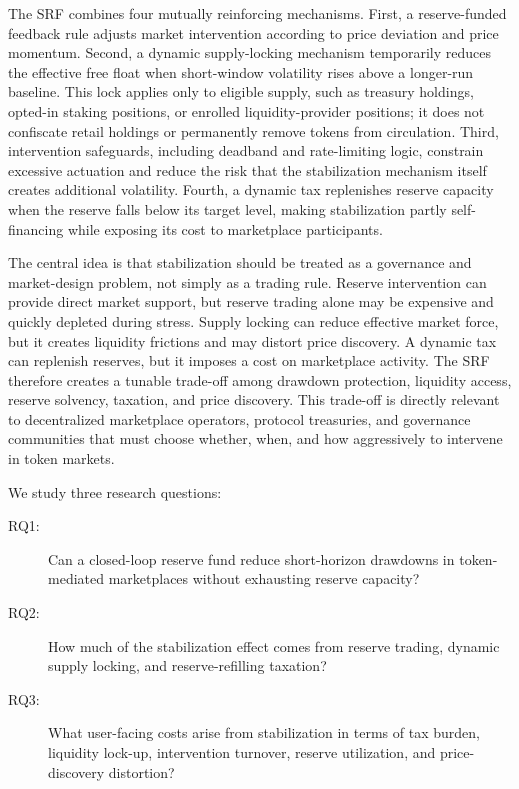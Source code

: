 \documentclass[a4paper,fleqn]{cas-dc}
\begin{document}
The SRF combines four mutually reinforcing mechanisms. First, a reserve-funded feedback rule adjusts market intervention according to price deviation and price momentum. Second, a dynamic supply-locking mechanism temporarily reduces the effective free float when short-window volatility rises above a longer-run baseline. This lock applies only to eligible supply, such as treasury holdings, opted-in staking positions, or enrolled liquidity-provider positions; it does not confiscate retail holdings or permanently remove tokens from circulation. Third, intervention safeguards, including deadband and rate-limiting logic, constrain excessive actuation and reduce the risk that the stabilization mechanism itself creates additional volatility. Fourth, a dynamic tax replenishes reserve capacity when the reserve falls below its target level, making stabilization partly self-financing while exposing its cost to marketplace participants.

The central idea is that stabilization should be treated as a governance and market-design problem, not simply as a trading rule. Reserve intervention can provide direct market support, but reserve trading alone may be expensive and quickly depleted during stress. Supply locking can reduce effective market force, but it creates liquidity frictions and may distort price discovery. A dynamic tax can replenish reserves, but it imposes a cost on marketplace activity. The SRF therefore creates a tunable trade-off among drawdown protection, liquidity access, reserve solvency, taxation, and price discovery. This trade-off is directly relevant to decentralized marketplace operators, protocol treasuries, and governance communities that must choose whether, when, and how aggressively to intervene in token markets.

We study three research questions:

\begin{description}
    \item[RQ1:] Can a closed-loop reserve fund reduce short-horizon drawdowns in token-mediated marketplaces without exhausting reserve capacity?
    \item[RQ2:] How much of the stabilization effect comes from reserve trading, dynamic supply locking, and reserve-refilling taxation?
    \item[RQ3:] What user-facing costs arise from stabilization in terms of tax burden, liquidity lock-up, intervention turnover, reserve utilization, and price-discovery distortion?
\end{description}
\end{document}

